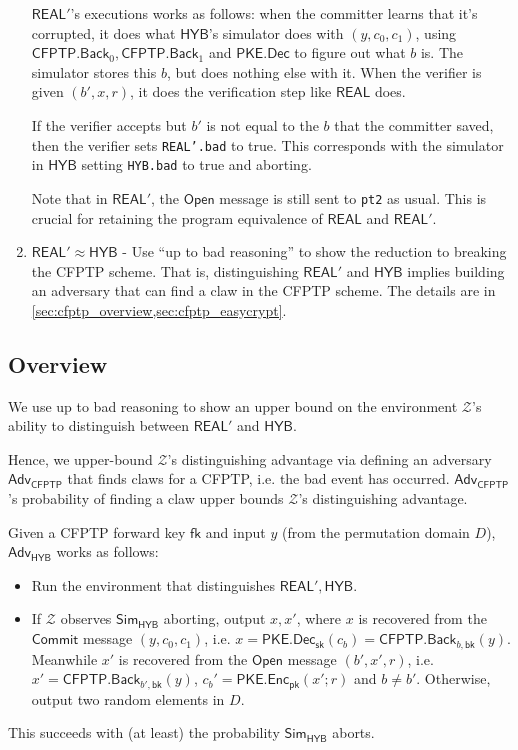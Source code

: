 \documentclass{article}[12pt]
\newcommand{\code}[1]{\texttt{#1}} %
\newcommand{\OpenMsg}{\mathsf{Open}}
\newcommand{\CommitMsg}{\mathsf{Commit}}
\newcommand{\PKE}{\mathsf{PKE}}
\newcommand{\Enc}{\mathsf{Enc}}
\newcommand{\Dec}{\mathsf{Dec}}
\newcommand{\EncKey}{\mathsf{pk}}
\newcommand{\DecKey}{\mathsf{sk}}
\newcommand{\CFPTP}{\mathsf{CFPTP}}
\newcommand{\Back}{\mathsf{Back}}
\newcommand{\ForwKey}{\mathsf{fk}}
\newcommand{\BackKey}{\mathsf{bk}}
\newcommand{\Domain}{D}
\newcommand{\Simulator}{{\mathsf{Sim}}} %
\newcommand{\Adversary}{{\mathsf{Adv}}} %
\newcommand{\Environment}{{\mathcal{Z}}} %
\newcommand{\CFPTPAdversary}{{\Adversary_\CFPTP}}
\newcommand{\Hyb}{{\mathsf{HYB}}}
\newcommand{\Real}{{\mathsf{REAL}}}
\begin{document}
\begin{enumerate}
	$\Real'$'s executions works as follows: when the committer learns that it's corrupted, it does what $\Hyb$'s simulator does with $(y, c_0, c_1)$, using $\CFPTP.\Back_0, \CFPTP.\Back_1$ and $\PKE.\Dec$ to figure out what $b$ is. The simulator stores this $b$, but does nothing else with it. When the verifier is given $(b', x, r)$, it does the verification step like $\Real$ does.

	If the verifier accepts but $b'$ is not equal to the $b$ that the committer saved, then the verifier sets \code{REAL'.bad} to true. This corresponds with the simulator in $\Hyb$ setting \code{HYB.bad} to true and aborting.

	Note that in $\Real'$, the $\OpenMsg$ message is still sent to \code{pt2} as usual. This is crucial for retaining the program equivalence of $\Real$ and $\Real'$.

	\item\label{hyb:1.2} $\Real' \approx \Hyb$ - Use ``up to bad reasoning'' to show the reduction to breaking the CFPTP scheme. That is, distinguishing $\Real'$ and $\Hyb$ implies building an adversary that can find a claw in the CFPTP scheme. The details are in \cref{sec:cfptp_overview,sec:cfptp_easycrypt}.

\end{enumerate}

\subsection{Overview}\label{sec:cfptp_overview}
We use up to bad reasoning to show an upper bound on the environment $\Environment$'s ability to distinguish between $\Real'$ and $\Hyb$.

Hence, we upper-bound $\Environment$'s distinguishing advantage via defining an adversary $\CFPTPAdversary$ that finds claws for a CFPTP, i.e. the bad event has occurred. $\CFPTPAdversary$'s probability of finding a claw upper bounds $\Environment$'s distinguishing advantage.

Given a CFPTP forward key $\ForwKey$ and input $y$ (from the permutation domain $\Domain$), $\Adversary_{\Hyb}$ works as follows:
\begin{itemize}
	\item Run the environment that distinguishes $\Real', \Hyb$.
	\item If $\Environment$ observes $\Simulator_\Hyb$ aborting, output $x, x'$, where $x$ is recovered from the $\CommitMsg$ message $(y, c_0, c_1)$, i.e. $x = \PKE.\Dec_{\DecKey}(c_b) = \CFPTP.\Back_{b, \BackKey}(y)$. Meanwhile $x'$ is recovered from the $\OpenMsg$ message $(b', x', r)$, i.e. $x' = \CFPTP.\Back_{b', \BackKey}(y)$, $c_b' = \PKE.\Enc_{\EncKey}(x'; r)$ and $b\ne b'$. Otherwise, output two random elements in $\Domain$.
\end{itemize}
This succeeds with (at least) the probability $\Simulator_\Hyb$ aborts.
\end{document}
